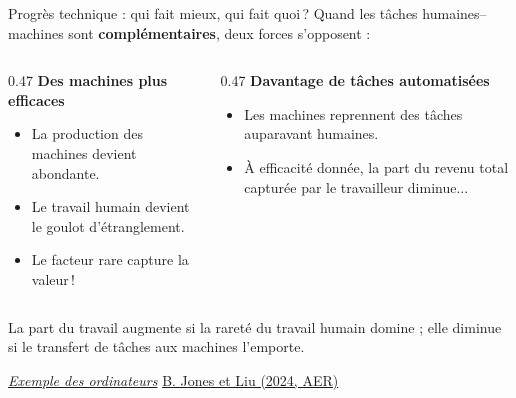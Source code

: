 \documentclass[aspectratio=169]{beamer}
\begin{document}

\begin{frame}[t,label=s3-main-progres-technique]{Progrès technique : qui fait mieux, qui fait quoi\,?}
   \small
   Quand les tâches humaines--machines sont \textbf{complémentaires}, deux forces s'opposent :
   \par\vspace{0.25cm}
   \begin{columns}[T]
      \begin{column}{0.47\textwidth}
         \RaggedRight
         \textbf{\textcolor{HECgreen}{Des machines plus efficaces}}
         \begin{itemize}
            \setlength\itemsep{0.2cm}
            \item La production des machines devient abondante.
            \item Le travail humain devient le goulot d'étranglement.
            \item Le facteur rare capture la valeur\,!
         \end{itemize}
      \end{column}
      \begin{column}{0.47\textwidth}
         \RaggedRight
         \textbf{\textcolor{HECcoral}{Davantage de tâches automatisées}}
         \begin{itemize}
            \setlength\itemsep{0.2cm}
            \item Les machines reprennent des tâches auparavant humaines.
            \item À efficacité donnée, la part du revenu total capturée par le travailleur diminue...
         \end{itemize}
      \end{column}
   \end{columns}
   \vspace{0.15cm}
   \begin{keyinsight}
      \RaggedRight
      La part du travail augmente si la rareté du travail humain domine ; elle diminue si le transfert de tâches aux machines l'emporte.
      \par{\scriptsize\hyperlink{s3-backup-ordinateurs}{%
         \textcolor{HECgray!75!HECnavy}{\textit{Exemple des ordinateurs}}}}\hfill
      {\scriptsize\textcolor{HECgray}{\href{https://doi.org/10.1257/aer.20221180}{B. Jones et Liu (2024, AER)}}}
   \end{keyinsight}
\end{frame}
\end{document}
